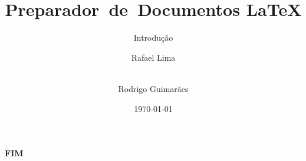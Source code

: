 \documentclass[svgnames]{beamer}
\title[O Preparador de~Documentos \LaTeX]{\LARGE{\textbf{Preparador~de~Documentos \LaTeX}}}
\subtitle{Introdução}
\author{Rafael Lima \and \\
        Rodrigo Guimarães}
\institute{UnB/EdSoc}
\date {\today}
\begin{document}


%











%


\begin{frame}
	\begin{center}\color{roxoEduSoc}
		\fontsize{50}{60}\selectfont \textbf{FIM}
	\end{center}
\end{frame}
\end{document}
